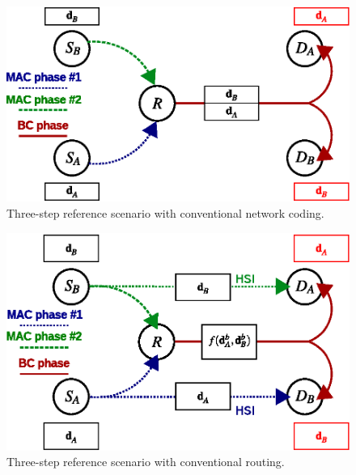 \documentclass{article}
\begin{document}
\begin{figure}
\begin{centering}
\includegraphics[width=0.75\columnwidth]{fig/2-SRN-sc_principle_BC-TWT_referenceB}
%
\par\end{centering}

\centering{}\caption{Three-step reference scenario with conventional network coding.\label{fig:CTUpp_ref3stepNC}}
\end{figure}


\begin{figure}
\begin{centering}
\includegraphics[width=0.75\columnwidth]{fig/2-SRN-sc_principle_BC-TWT_referenceB1}
\par\end{centering}

\centering{}\caption{Three-step reference scenario with conventional routing.\label{fig:CTUpp_ref3stepRouting}}
\end{figure}
\end{document}
